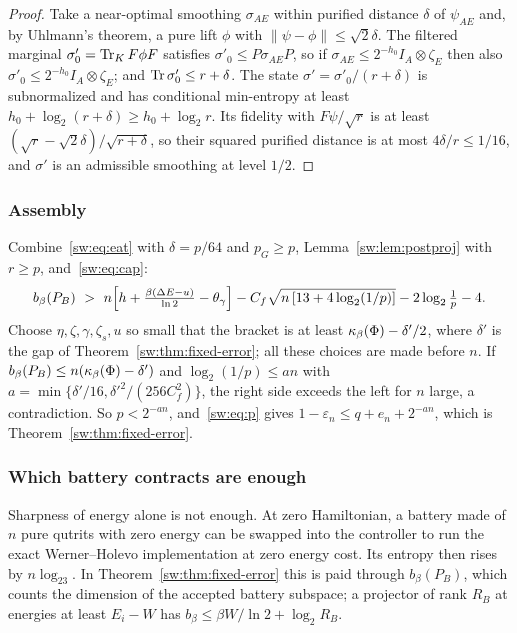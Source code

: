 \begin{proof}
Take a near-optimal smoothing $\sigma_{AE}$ within purified distance $\delta$ of $\psi_{AE}$ and, by Uhlmann's theorem, a pure lift $\phi$ with $\|\psi-\phi\|\le\sqrt2\delta$. The filtered marginal $\sigma'_0=\operatorname{Tr}_KF\phi F$ satisfies $\sigma'_0\le P\sigma_{AE}P$, so if $\sigma_{AE}\le2^{-h_0}I_A\otimes\zeta_E$ then also $\sigma'_0\le2^{-h_0}I_A\otimes\zeta_E$; and $\operatorname{Tr}\sigma'_0\le r+\delta$. The state $\sigma'=\sigma'_0/(r+\delta)$ is subnormalized and has conditional min-entropy at least $h_0+\log_2(r+\delta)\ge h_0+\log_2r$. Its fidelity with $F\psi/\sqrt r$ is at least $(\sqrt r-\sqrt2\delta)/\sqrt{r+\delta}$, so their squared purified distance is at most $4\delta/r\le1/16$, and $\sigma'$ is an admissible smoothing at level $1/2$.
\end{proof}

\subsubsection{Assembly}

Combine~\eqref{sw:eq:eat} with $\delta=p/64$ and $p_G\ge p$, Lemma~\ref{sw:lem:postproj} with $r\ge p$, and~\eqref{sw:eq:cap}:
\[
b_\beta(P_B)\ >\ n\Bigl[h+\tfrac{\beta(\Delta E-u)}{\ln2}-\theta_\gamma\Bigr]-C_f\sqrt{n\,[13+4\log_2(1/p)]}-2\log_2\tfrac1p-4.
\]
Choose $\eta,\zeta,\gamma,\zeta_s,u$ so small that the bracket is at least $\kappa_\beta(\Phi)-\delta'/2$, where $\delta'$ is the gap of Theorem~\ref{sw:thm:fixed-error}; all these choices are made before $n$. If $b_\beta(P_B)\le n(\kappa_\beta(\Phi)-\delta')$ and $\log_2(1/p)\le an$ with $a=\min\{\delta'/16,\delta'^2/(256C_f^2)\}$, the right side exceeds the left for $n$ large, a contradiction. So $p<2^{-an}$, and~\eqref{sw:eq:p} gives $1-\varepsilon_n\le q+e_n+2^{-an}$, which is Theorem~\ref{sw:thm:fixed-error}.

\subsubsection{Which battery contracts are enough}

\begin{remark}\label{sw:rem:counted}
Sharpness of energy alone is not enough. At zero Hamiltonian, a battery made of $n$ pure qutrits with zero energy can be swapped into the controller to run the exact Werner--Holevo implementation at zero energy cost. Its entropy then rises by $n\log_23$. In Theorem~\ref{sw:thm:fixed-error} this is paid through $b_\beta(P_B)$, which counts the dimension of the accepted battery subspace; a projector of rank $R_B$ at energies at least $E_i-W$ has $b_\beta\le\beta W/\ln2+\log_2R_B$.
\end{remark}

